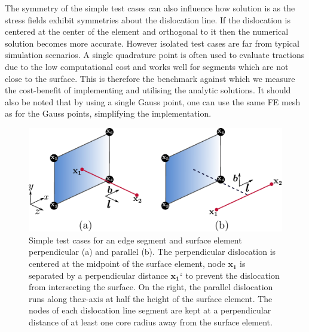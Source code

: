 \documentclass[11pt]{iopart}
\begin{document}
The symmetry of the simple test cases can also influence how solution is as the stress fields exhibit symmetries about the dislocation line. If the dislocation is centered at the center of the element and orthogonal to it then the numerical solution becomes more accurate. However isolated test cases are far from typical simulation scenarios. A single quadrature point is often used to evaluate tractions due to the low computational cost and works well for segments which are not close to the surface. This is therefore the benchmark against which we measure the cost-benefit of implementing and utilising the analytic solutions. It should also be noted that by using a single Gauss point, one can use the same FE mesh as for the Gauss points, simplifying the implementation. %
%		
\begin{figure}
    \centering
    \includegraphics[width=0.8\linewidth]{images/test_gauss_quad.pdf}
    \caption{Simple test cases for an edge segment and surface element perpendicular (a) and parallel (b). The perpendicular dislocation is centered at the midpoint of the surface element, node $\mathbf{x_1}$ is separated by a perpendicular distance $\mathbf{x_1}^z$ to prevent the dislocation from intersecting the surface. On the right, the parallel dislocation runs along the$x$-axis at half the height of the surface element. The nodes of each dislocation line segment are kept at a perpendicular distance of at least one core radius away from the surface element.}
    \label{f:gauss_quad_test}
\end{figure}
\end{document}
